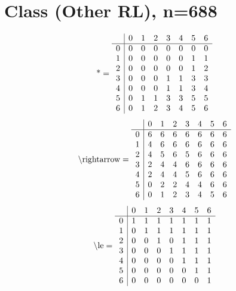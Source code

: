 \documentclass[11pt]{article}
\begin{document}
\section{Class (Other RL), n=688}
\[\text{*} = 
\begin{array}{r | r r r r r r r}
 & 0 & 1 & 2 & 3 & 4 & 5 & 6 \\ \hline
0 & 0 & 0 & 0 & 0 & 0 & 0 & 0 \\
1 & 0 & 0 & 0 & 0 & 0 & 1 & 1 \\
2 & 0 & 0 & 0 & 0 & 0 & 1 & 2 \\
3 & 0 & 0 & 0 & 1 & 1 & 3 & 3 \\
4 & 0 & 0 & 0 & 1 & 1 & 3 & 4 \\
5 & 0 & 1 & 1 & 3 & 3 & 5 & 5 \\
6 & 0 & 1 & 2 & 3 & 4 & 5 & 6 \\
\end{array}
\]
\[\text{\textbackslash rightarrow} = 
\begin{array}{r | r r r r r r r}
 & 0 & 1 & 2 & 3 & 4 & 5 & 6 \\ \hline
0 & 6 & 6 & 6 & 6 & 6 & 6 & 6 \\
1 & 4 & 6 & 6 & 6 & 6 & 6 & 6 \\
2 & 4 & 5 & 6 & 5 & 6 & 6 & 6 \\
3 & 2 & 4 & 4 & 6 & 6 & 6 & 6 \\
4 & 2 & 4 & 4 & 5 & 6 & 6 & 6 \\
5 & 0 & 2 & 2 & 4 & 4 & 6 & 6 \\
6 & 0 & 1 & 2 & 3 & 4 & 5 & 6 \\
\end{array}
\]
\[\text{\textbackslash le} = 
\begin{array}{r | r r r r r r r}
 & 0 & 1 & 2 & 3 & 4 & 5 & 6 \\ \hline
0 & 1 & 1 & 1 & 1 & 1 & 1 & 1 \\
1 & 0 & 1 & 1 & 1 & 1 & 1 & 1 \\
2 & 0 & 0 & 1 & 0 & 1 & 1 & 1 \\
3 & 0 & 0 & 0 & 1 & 1 & 1 & 1 \\
4 & 0 & 0 & 0 & 0 & 1 & 1 & 1 \\
5 & 0 & 0 & 0 & 0 & 0 & 1 & 1 \\
6 & 0 & 0 & 0 & 0 & 0 & 0 & 1 \\
\end{array}
\]
\end{document}
